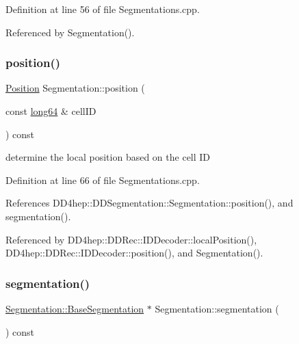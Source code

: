 Definition at line 56 of file Segmentations.\+cpp.



Referenced by Segmentation().

\hypertarget{class_d_d4hep_1_1_geometry_1_1_segmentation_a870d558d46763a00c16b6bed9e1a06f5}{}\label{class_d_d4hep_1_1_geometry_1_1_segmentation_a870d558d46763a00c16b6bed9e1a06f5} 
\subsubsection{\texorpdfstring{position()}{position()}}
{\footnotesize\ttfamily \hyperlink{namespace_d_d4hep_1_1_geometry_a55083902099d03506c6db01b80404900}{Position} Segmentation\+::position (\begin{DoxyParamCaption}\item[{const \hyperlink{namespace_d_d4hep_ac2a70e722b33dc7ddaa20db8954ac836}{long64} \&}]{cell\+ID }\end{DoxyParamCaption}) const}



determine the local position based on the cell ID 



Definition at line 66 of file Segmentations.\+cpp.



References D\+D4hep\+::\+D\+D\+Segmentation\+::\+Segmentation\+::position(), and segmentation().



Referenced by D\+D4hep\+::\+D\+D\+Rec\+::\+I\+D\+Decoder\+::local\+Position(), D\+D4hep\+::\+D\+D\+Rec\+::\+I\+D\+Decoder\+::position(), and Segmentation().

\hypertarget{class_d_d4hep_1_1_geometry_1_1_segmentation_a72ebea05efd4acd46adb3ed985c3f1d9}{}\label{class_d_d4hep_1_1_geometry_1_1_segmentation_a72ebea05efd4acd46adb3ed985c3f1d9} 
\subsubsection{\texorpdfstring{segmentation()}{segmentation()}}
{\footnotesize\ttfamily \hyperlink{class_d_d4hep_1_1_geometry_1_1_segmentation_a50fcd62c91daf63c26a333d1ee51b192}{Segmentation\+::\+Base\+Segmentation} $\ast$ Segmentation\+::segmentation (\begin{DoxyParamCaption}{ }\end{DoxyParamCaption}) const}




